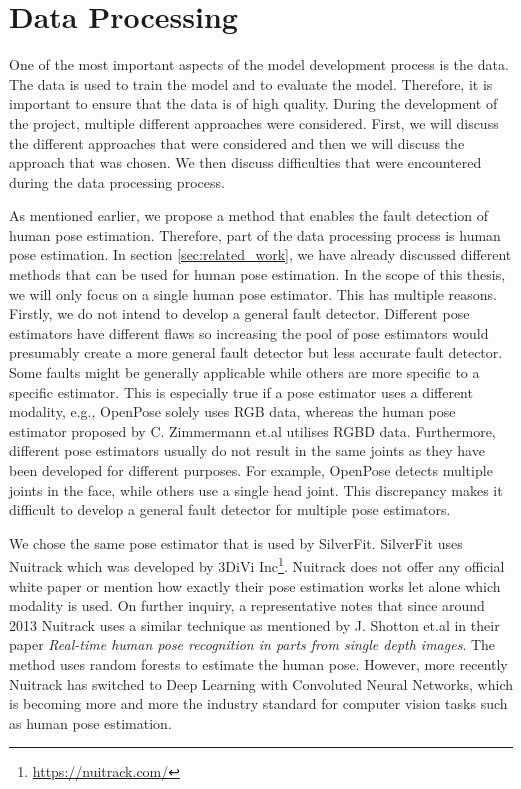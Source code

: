 \chapter{Data Processing}
\label{sec:data_processing}

One of the most important aspects of the model development process is the data. The data is used to train the model and to evaluate the model. Therefore, it is important to ensure that the data is of high quality. During the development of the project, multiple different approaches were considered. First, we will discuss the different approaches that were considered and then we will discuss the approach that was chosen. We then discuss difficulties that were encountered during the data processing process.

As mentioned earlier, we propose a method that enables the fault detection of human pose estimation. Therefore, part of the data processing process is human pose estimation. In section \ref{sec:related_work}, we have already discussed different methods that can be used for human pose estimation. In the scope of this thesis, we will only focus on a single human pose estimator. This has multiple reasons. Firstly, we do not intend to develop a general fault detector. Different pose estimators have different flaws so increasing the pool of pose estimators would presumably create a more general fault detector but less accurate fault detector. Some faults might be generally applicable while others are more specific to a specific estimator. This is especially true if a pose estimator uses a different modality, e.g., OpenPose solely uses RGB data, whereas the human pose estimator proposed by C. Zimmermann et.al utilises RGBD data\cite{OpenPosePose, RGBDHPEforRoboticTaskLearning}. Furthermore, different pose estimators usually do not result in the same joints as they have been developed for different purposes. For example, OpenPose detects multiple joints in the face, while others use a single head joint. This discrepancy makes it difficult to develop a general fault detector for multiple pose estimators. 

We chose the same pose estimator that is used by SilverFit. SilverFit uses Nuitrack which was developed by 3DiVi Inc\footnote{\url{https://nuitrack.com/}}. Nuitrack does not offer any official white paper or mention how exactly their pose estimation works let alone which modality is used. On further inquiry, a representative notes that since around 2013 Nuitrack uses a similar technique as mentioned by J. Shotton et.al in their paper \textit{Real-time human pose recognition in parts from single depth images}\cite{EarlyRGBDHPE}. The method uses random forests to estimate the human pose. However, more recently Nuitrack has switched to Deep Learning with Convoluted Neural Networks, which is becoming more and more the industry standard for computer vision tasks such as human pose estimation.

